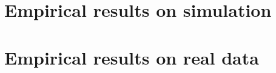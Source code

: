 
\lipsum[5]

\section{Empirical results on simulation}

\lipsum[5]

\section{Empirical results on real data}

\lipsum[5]
